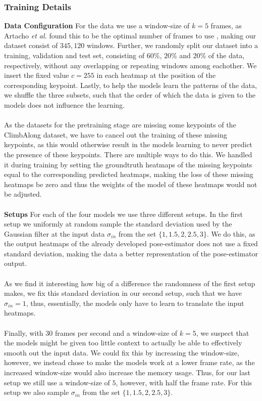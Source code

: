 \documentclass[./main.tex]{subfiles}
\begin{document}
\subsubsection{Training Details}
\label{subsubsec:training_details}
\textbf{Data Configuration} For the data we use a window-size of $k = 5$ frames, as Artacho \textit{et al.} found this to be the optimal number of frames to use \cite{https://doi.org/10.48550/arxiv.2001.08095}, making our dataset consist of $345,120$ windows. Further, we randomly split our dataset into a training, validation and test set, consisting of $60\%$, $20\%$ and $20\%$ of the data, respectively, without any overlapping or repeating windows among eachother. We insert the fixed value $c = 255$ in each heatmap at the position of the corresponding keypoint. Lastly, to help the models learn the patterns of the data, we shuffle the three subsets, such that the order of which the data is given to the models does not influence the learning.
\\
\\
As the datasets for the pretraining stage are missing some keypoints of the ClimbAlong dataset, we have to cancel out the training of these missing keypoints, as this would otherwise result in the models learning to never predict the presence of these keypoints. There are multiple ways to do this. We handled it during training by setting the groundtruth heatmaps of the missing keypoints equal to the corresponding predicted heatmaps, making the loss of these missing heatmaps be zero and thus the weights of the model of these heatmaps would not be adjusted. 
\\
\\
\textbf{Setups} For each of the four models we use three different setups. In the first setup we uniformly at random sample the standard deviation used by the Gaussian filter at the input data $\sigma_{in}$ from the set $\{1, 1.5, 2, 2.5, 3\}$. We do this, as the output heatmaps of the already developed pose-estimator does not use a fixed standard deviation, making the data a better representation of the pose-estimator output. 
\\
\\
As we find it interesting how big of a difference the randomness of the first setup makes, we fix this standard deviation in our second setup, such that we have $\sigma_{in} = 1$, thus, essentially, the models only have to learn to translate the input heatmaps.
\\
\\
Finally, with $30$ frames per second and a window-size of $k = 5$, we suspect that the models might be given too little context to actually be able to effectively smooth out the input data. We could fix this by increasing the window-size, however, we instead chose to make the models work at a lower frame rate, as the increased window-size would also increase the memory usage. Thus, for our last setup we still use a window-size of $5$, however, with half the frame rate. For this setup we also sample $\sigma_{in}$ from the set $\{1, 1.5, 2, 2.5, 3\}$.
\end{document}

